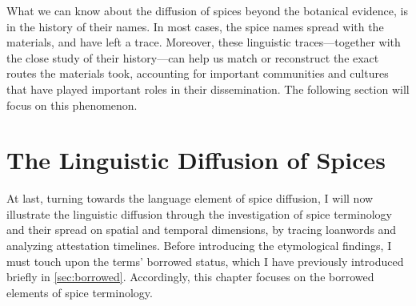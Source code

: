 What we can know about the diffusion of spices beyond the botanical evidence, is in the history of their names. In most cases, the spice names spread with the materials, and have left a trace. Moreover, these linguistic traces---together with the close study of their history---can help us match or reconstruct the exact routes the materials took, accounting for important communities and cultures that have played important roles in their dissemination. The following section will focus on this phenomenon.

\section{The Linguistic Diffusion of Spices}
\label{linguistic_diffusion}

At last, turning towards the language element of spice diffusion, I will now illustrate the linguistic diffusion through the investigation of spice terminology and their spread on spatial and temporal dimensions, by tracing loanwords and analyzing attestation timelines. Before introducing the etymological findings, I must touch upon the terms' borrowed status, which I have previously introduced briefly in \cref{sec:borrowed}. Accordingly, this chapter focuses on the borrowed elements of spice terminology.


